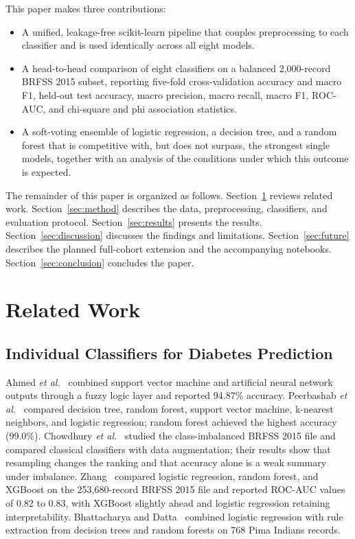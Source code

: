 \documentclass[conference]{IEEEtran}
\begin{document}
This paper makes three contributions:
\begin{itemize}
\item A unified, leakage-free scikit-learn pipeline that couples preprocessing to each classifier and is used identically across all eight models.
\item A head-to-head comparison of eight classifiers on a balanced 2,000-record BRFSS 2015 subset, reporting five-fold cross-validation accuracy and macro F1, held-out test accuracy, macro precision, macro recall, macro F1, ROC-AUC, and chi-square and phi association statistics.
\item A soft-voting ensemble of logistic regression, a decision tree, and a random forest that is competitive with, but does not surpass, the strongest single models, together with an analysis of the conditions under which this outcome is expected.
\end{itemize}

The remainder of this paper is organized as follows. Section~\ref{sec:related} reviews related work. Section~\ref{sec:method} describes the data, preprocessing, classifiers, and evaluation protocol. Section~\ref{sec:results} presents the results. Section~\ref{sec:discussion} discusses the findings and limitations. Section~\ref{sec:future} describes the planned full-cohort extension and the accompanying notebooks. Section~\ref{sec:conclusion} concludes the paper.

\section{Related Work}
\label{sec:related}

\subsection{Individual Classifiers for Diabetes Prediction}

Ahmed \textit{et al.}~\cite{ahmed2022ieee} combined support vector machine and artificial neural network outputs through a fuzzy logic layer and reported 94.87\% accuracy. Peerbashab \textit{et al.}~\cite{peerbashab2023} compared decision tree, random forest, support vector machine, k-nearest neighbors, and logistic regression; random forest achieved the highest accuracy (99.0\%). Chowdhury \textit{et al.}~\cite{chowdhury2024brfss} studied the class-imbalanced BRFSS 2015 file and compared classical classifiers with data augmentation; their results show that resampling changes the ranking and that accuracy alone is a weak summary under imbalance. Zhang~\cite{zhang2025brfss} compared logistic regression, random forest, and XGBoost on the 253,680-record BRFSS 2015 file and reported ROC-AUC values of 0.82 to 0.83, with XGBoost slightly ahead and logistic regression retaining interpretability. Bhattacharya and Datta~\cite{bhattacharya2023ieee} combined logistic regression with rule extraction from decision trees and random forests on 768 Pima Indians records.
\end{document}
